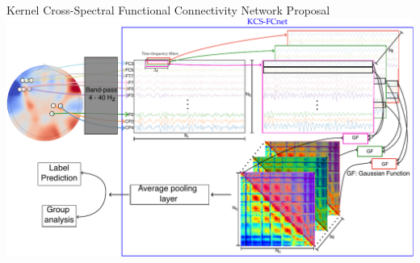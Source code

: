 \documentclass[aspectratio=169]{beamer}
\begin{document}
\begin{frame}{Kernel Cross-Spectral Functional Connectivity Network Proposal}
    \centering
    \includegraphics[scale=0.5]{../Tesis_document/Figures/outline_and_contributions/contribution2.pdf}
\end{frame}
\end{document}
